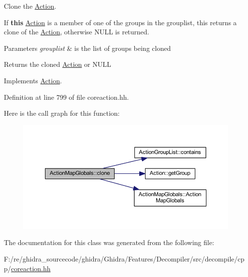Clone the \mbox{\hyperlink{class_action}{Action}}. 

If {\bfseries{this}} \mbox{\hyperlink{class_action}{Action}} is a member of one of the groups in the grouplist, this returns a clone of the \mbox{\hyperlink{class_action}{Action}}, otherwise N\+U\+LL is returned. 
\begin{DoxyParams}{Parameters}
{\em grouplist} & is the list of groups being cloned \\
\hline
\end{DoxyParams}
\begin{DoxyReturn}{Returns}
the cloned \mbox{\hyperlink{class_action}{Action}} or N\+U\+LL 
\end{DoxyReturn}


Implements \mbox{\hyperlink{class_action_af8242e41d09e5df52f97df9e65cc626f}{Action}}.



Definition at line 799 of file coreaction.\+hh.

Here is the call graph for this function\+:
\nopagebreak
\begin{figure}[H]
\begin{center}
\leavevmode
\includegraphics[width=350pt]{class_action_map_globals_ae5d0f824a0c3e33c588a7d90ed1ab3f5_cgraph}
\end{center}
\end{figure}


The documentation for this class was generated from the following file\+:\begin{DoxyCompactItemize}
\item 
F\+:/re/ghidra\+\_\+sourcecode/ghidra/\+Ghidra/\+Features/\+Decompiler/src/decompile/cpp/\mbox{\hyperlink{coreaction_8hh}{coreaction.\+hh}}\end{DoxyCompactItemize}
